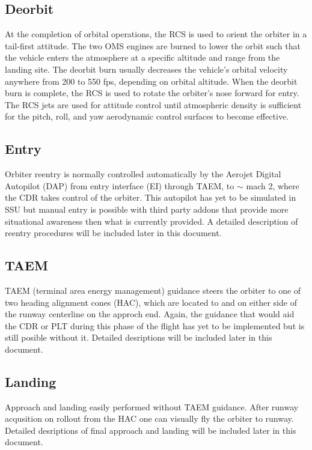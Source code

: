 \documentclass[13pt, letter,final]{article}
\begin{document}
\begin{multicols}{2}
\begin{center}
\subsection*{Deorbit}
\end{center}
At the completion of orbital operations, the RCS is used to orient the orbiter in a tail-first attitude. The two OMS engines are burned to lower the orbit such that the vehicle enters the atmosphere at a specific altitude and range from the landing site. The deorbit burn usually decreases the vehicle's orbital velocity anywhere from 200 to 550 fps, depending on orbital altitude.  When the deorbit burn is complete, the RCS is used to rotate the orbiter's nose forward for entry. The RCS jets are used for attitude control until atmospheric density is sufficient for the pitch, roll, and yaw aerodynamic control surfaces to become effective.
\\
\begin{center}
\subsection*{Entry}
\end{center}
Orbiter reentry is normally controlled automatically by the Aerojet Digital Autopilot (DAP) from entry interface (EI) through TAEM, to $\sim$ mach 2, where the CDR takes control of the orbiter. This autopilot has yet to be simulated in SSU but manual entry is possible with third party addons that provide more situational awareness then what is currently provided.  A detailed description of reentry procedures will be included later in this document.
\\
\begin{center}
\subsection*{TAEM}
\end{center}
TAEM (terminal area energy management) guidance steers the orbiter to one of two heading alignment cones (HAC), which are located to and on either side of the runway centerline on the approch end.  Again, the guidance that would aid the CDR or PLT during this phase of the flight has yet to be implemented but is still posible without it. Detailed desriptions will be included later in this document.
\\
\begin{center}
\subsection*{Landing}
\end{center}
Approach and landing easily performed without TAEM guidance. After runway acqusition on rollout from the HAC one can visually fly the orbiter to runway. Detailed desriptions of final approach and landing will be included later in this document.\\


\end{multicols}
\end{document}
